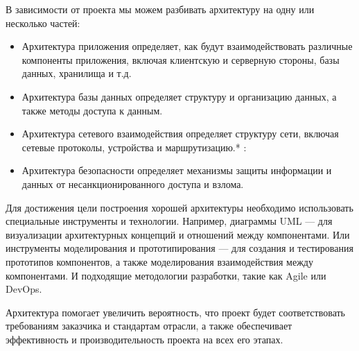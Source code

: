 \documentclass[letterpaper,10pt,russian]{sphinxmanual}
\begin{document}
\sphinxAtStartPar
В зависимости от проекта мы можем разбивать архитектуру на одну или несколько частей:
\begin{itemize}
\item {} 
\sphinxAtStartPar
Архитектура приложения определяет, как будут взаимодействовать различные компоненты приложения, включая клиентскую и серверную стороны, базы данных, хранилища и т.д.

\item {} 
\sphinxAtStartPar
Архитектура базы данных определяет структуру и организацию данных, а также методы доступа к данным.

\item {} 
\sphinxAtStartPar
Архитектура сетевого взаимодействия определяет структуру сети, включая сетевые протоколы, устройства и маршрутизацию.* : 

\item {} 
\sphinxAtStartPar
Архитектура безопасности определяет механизмы защиты информации и данных от несанкционированного доступа и взлома.

\end{itemize}

\sphinxAtStartPar
Для достижения цели построения хорошей архитектуры необходимо использовать специальные инструменты и технологии. Например, диаграммы UML — для визуализации архитектурных концепций и отношений между компонентами. Или инструменты моделирования и прототипирования — для создания и тестирования прототипов компонентов, а также моделирования взаимодействия между компонентами. И подходящие методологии разработки, такие как Agile или DevOps.

\sphinxAtStartPar
Архитектура помогает увеличить вероятность, что проект будет соответствовать требованиям заказчика и стандартам отрасли, а также обеспечивает эффективность и производительность проекта на всех его этапах.
\end{document}
